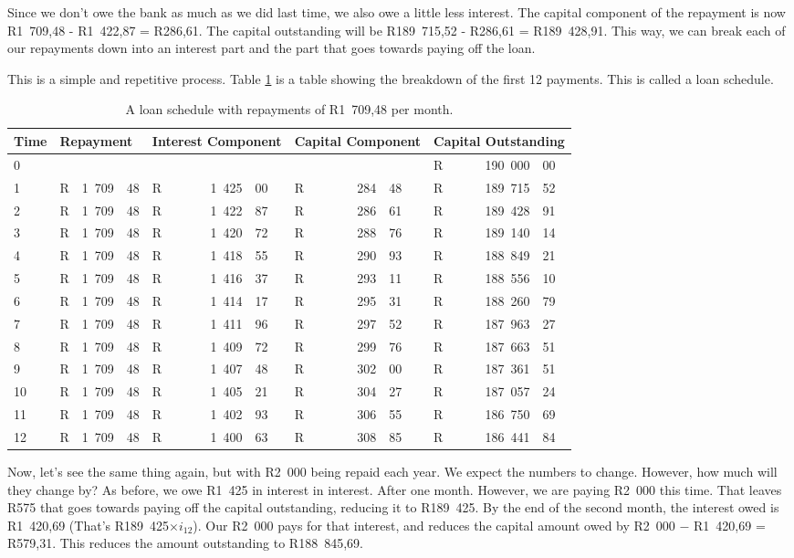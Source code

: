Since we don't owe the bank as much as we did last time, we also owe a little less interest. The capital component of the repayment is now R1~709,48 - R1~422,87 = R286,61. The capital outstanding will be R189~715,52 - R286,61 = R189~428,91. This way, we can break each of our repayments down into an interest part and the part that goes towards paying off the loan.

This is a simple and repetitive process. Table \ref{tb:lschedule1} is a table showing the breakdown of the first 12 payments. This is called a loan schedule.

\begin{table}
\begin{center}
\begin{tabular}{|l|lr@{,}l|lr@{,}l|lr@{,}l|lr@{,}l|}
\hline
Time&\multicolumn{3}{l|}{Repayment}&\multicolumn{3}{p{2cm}|}{Interest Component}&\multicolumn{3}{p{2cm}|}{Capital Component}&\multicolumn{3}{p{2.5cm}|}{Capital Outstanding}\\
\hline
\hline
0&\multicolumn{3}{l|}{}&\multicolumn{3}{r|}{}&\multicolumn{3}{r|}{}&R&190~000&00\\
1&R&1~709&48&R&1~425&00&R&284&48&R&189~715&52\\
2&R&1~709&48&R&1~422&87&R&286&61&R&189~428&91\\
3&R&1~709&48&R&1~420&72&R&288&76&R&189~140&14\\
4&R&1~709&48&R&1~418&55&R&290&93&R&188~849&21\\
5&R&1~709&48&R&1~416&37&R&293&11&R&188~556&10\\
6&R&1~709&48&R&1~414&17&R&295&31&R&188~260&79\\
7&R&1~709&48&R&1~411&96&R&297&52&R&187~963&27\\
8&R&1~709&48&R&1~409&72&R&299&76&R&187~663&51\\
9&R&1~709&48&R&1~407&48&R&302&00&R&187~361&51\\
10&R&1~709&48&R&1~405&21&R&304&27&R&187~057&24\\
11&R&1~709&48&R&1~402&93&R&306&55&R&186~750&69\\
12&R&1~709&48&R&1~400&63&R&308&85&R&186~441&84\\

\hline
\end{tabular}
\end{center}
\caption{A loan schedule with repayments of R1~709,48 per month.}
\label{tb:lschedule1}
\end{table}

Now, let's see the same thing again, but with R2~000 being repaid each year. We expect the numbers to change. However, how much will they change by? As before, we owe R1~425 in interest in interest. After one month. However, we are paying R2~000 this time. That leaves R575 that goes towards paying off the capital outstanding, reducing it to R189~425. By the end of the second month, the interest owed is R1~420,69 (That's R189~425$\times i_{12}$). Our R2~000 pays for that interest, and reduces the capital amount owed by R2~000 $-$ R1~420,69 = R579,31. This reduces the amount outstanding to R188~845,69.

